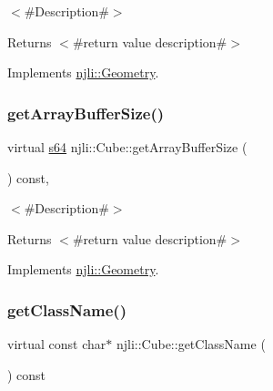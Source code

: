 $<$\#\+Description\#$>$

\begin{DoxyReturn}{Returns}
$<$\#return value description\#$>$ 
\end{DoxyReturn}


Implements \mbox{\hyperlink{classnjli_1_1_geometry_adbf0ae6c38f23779df2b37708e80c24c}{njli\+::\+Geometry}}.

\mbox{\label{classnjli_1_1_cube_a44544af58aae672e358e364877af9a16}} 
\subsubsection{\texorpdfstring{get\+Array\+Buffer\+Size()}{getArrayBufferSize()}}
{\footnotesize\ttfamily virtual \mbox{\hyperlink{_util_8h_a4258bfb2c3a440d06c4aaa3c2b450dde}{s64}} njli\+::\+Cube\+::get\+Array\+Buffer\+Size (\begin{DoxyParamCaption}{ }\end{DoxyParamCaption}) const\hspace{0.3cm}{\ttfamily [protected]}, {\ttfamily [virtual]}}

$<$\#\+Description\#$>$

\begin{DoxyReturn}{Returns}
$<$\#return value description\#$>$ 
\end{DoxyReturn}


Implements \mbox{\hyperlink{classnjli_1_1_geometry_a97ec03852997043d6900af8009b390d9}{njli\+::\+Geometry}}.

\mbox{\label{classnjli_1_1_cube_ab6515dcb9f54a3bf9945dacbb88d2eca}} 
\subsubsection{\texorpdfstring{get\+Class\+Name()}{getClassName()}}
{\footnotesize\ttfamily virtual const char$\ast$ njli\+::\+Cube\+::get\+Class\+Name (\begin{DoxyParamCaption}{ }\end{DoxyParamCaption}) const\hspace{0.3cm}{\ttfamily [virtual]}}

